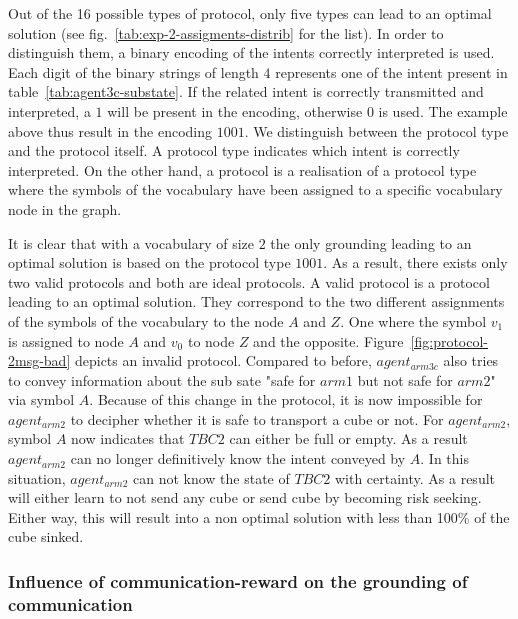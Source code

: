 Out of the 16 possible types of protocol, only five types can lead to an optimal solution (see fig.~\ref{tab:exp-2-assigments-distrib} for the list). In order to distinguish them, a binary encoding of the intents correctly interpreted is used. Each digit of the binary strings of length $4$ represents one of the intent present in table~\ref{tab:agent3c-substate}. If the related intent is correctly transmitted and interpreted, a $1$ will be present in the encoding, otherwise $0$ is used. The example above thus result in the encoding $1001$. We distinguish between the protocol type and the protocol itself. A protocol type indicates which intent is correctly interpreted. On the other hand, a protocol is a realisation of a protocol type where the symbols of the vocabulary have been assigned to a specific vocabulary node in the graph.

It is clear that with a vocabulary of size $2$ the only grounding leading to an optimal solution is based on the protocol type $1001$.  As a result, there exists only two valid protocols and both are ideal protocols. A valid protocol is a protocol leading to an optimal solution. They correspond to the two different assignments of the symbols of the vocabulary to the node $A$ and $Z$. One where the symbol $v_1$ is assigned to node $A$ and $v_0$ to node $Z$ and the opposite. Figure~\ref{fig:protocol-2msg-bad} depicts an invalid protocol. Compared to before, $agent_{arm3c}$ also tries to convey information about the sub sate "safe for $arm1$ but not safe for $arm2$" via symbol $A$. Because of this change in the protocol, it is now impossible for $agent_{arm2}$ to decipher whether it is safe to transport a cube or not. For $agent_{arm2}$, symbol $A$ now indicates that $TBC2$ can either be full or empty. As a result $agent_{arm2}$ can no longer definitively know the intent conveyed by $A$. In this situation, $agent_{arm2}$ can not know the state of $TBC2$ with certainty. As a result will either learn to not send any cube or send cube by becoming risk seeking. Either way, this will result into a non optimal solution with less than 100\% of the cube sinked.

\subsubsection*{Influence of communication-reward on the grounding of communication}

